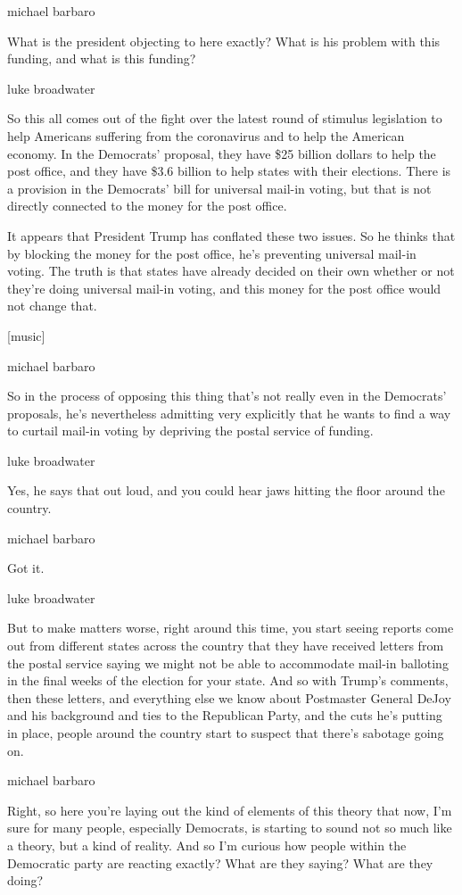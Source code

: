 michael barbaro

What is the president objecting to here exactly? What is his problem
with this funding, and what is this funding?

luke broadwater

So this all comes out of the fight over the latest round of stimulus
legislation to help Americans suffering from the coronavirus and to help
the American economy. In the Democrats' proposal, they have \$25 billion
dollars to help the post office, and they have \$3.6 billion to help
states with their elections. There is a provision in the Democrats' bill
for universal mail-in voting, but that is not directly connected to the
money for the post office.

It appears that President Trump has conflated these two issues. So he
thinks that by blocking the money for the post office, he's preventing
universal mail-in voting. The truth is that states have already decided
on their own whether or not they're doing universal mail-in voting, and
this money for the post office would not change that.

{[}music{]}

michael barbaro

So in the process of opposing this thing that's not really even in the
Democrats' proposals, he's nevertheless admitting very explicitly that
he wants to find a way to curtail mail-in voting by depriving the postal
service of funding.

luke broadwater

Yes, he says that out loud, and you could hear jaws hitting the floor
around the country.

michael barbaro

Got it.

luke broadwater

But to make matters worse, right around this time, you start seeing
reports come out from different states across the country that they have
received letters from the postal service saying we might not be able to
accommodate mail-in balloting in the final weeks of the election for
your state. And so with Trump's comments, then these letters, and
everything else we know about Postmaster General DeJoy and his
background and ties to the Republican Party, and the cuts he's putting
in place, people around the country start to suspect that there's
sabotage going on.

michael barbaro

Right, so here you're laying out the kind of elements of this theory
that now, I'm sure for many people, especially Democrats, is starting to
sound not so much like a theory, but a kind of reality. And so I'm
curious how people within the Democratic party are reacting exactly?
What are they saying? What are they doing?

